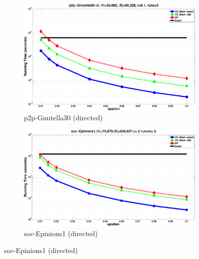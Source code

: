 \begin{figure}[ht]
  \centering
  \begin{subfigure}[b]{0.49\textwidth}
    \includegraphics[width=\textwidth]{centrsampl/figures/eps/p2p-Gnutella30-time}
    \caption{p2p-Gnutella30 (directed)}
    \label{fig:centrsamplgnutella:time}
  \end{subfigure}
  \ifproof
  \hfill
  \begin{subfigure}[b]{0.49\textwidth}
    \includegraphics[width=\textwidth]{centrsampl/figures/eps/soc-Epinions1-time}
    \caption{soc-Epinions1 (directed)}
    \label{fig:centrsamplEpinions:time}
  \end{subfigure}


\end{figure}
